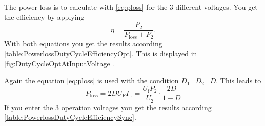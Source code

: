 \begin{solutionblock}
    The power loss is to calculate with \eqref{eq:ploss} for the 3 different voltages.
    You get the efficiency by applying
    \begin{equation}
        \eta = \frac{P_\mathrm{2}}{P_\mathrm{loss}+P_\mathrm{2}}.
    \end{equation}
    With both equations you get the results according \autoref{table:PowerlossDutyCycleEfficiencyOpt}.
    This is displayed in \autoref{fig:DutyCycleOptAtInputVoltage}.

    
    
    
\end{solutionblock}


\begin{solutionblock}
    Again the equation \eqref{eq:ploss} is used with the condition $D_1$=$D_2$=$D$. This leads to
    \begin{equation}
        P_\mathrm{loss}=2D U_\mathrm{F} I_\mathrm{L} = \frac{U_\mathrm{f} P_\mathrm{2}}{U_\mathrm{2}} \cdot \frac{2D}{1-D}
    \end{equation}
    If you enter the 3 operation voltages you get the results according \autoref{table:PowerlossDutyCycleEfficiencySync}.
    
    
\end{solutionblock}


